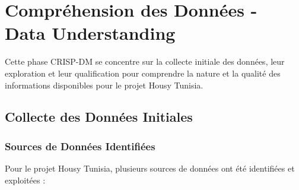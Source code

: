 \chapter{Compréhension des Données - Data Understanding}

\begin{objectivebox}
Cette phase CRISP-DM se concentre sur la collecte initiale des données, leur exploration et leur qualification pour comprendre la nature et la qualité des informations disponibles pour le projet Housy Tunisia.
\end{objectivebox}

\section{Collecte des Données Initiales}

\subsection{Sources de Données Identifiées}

Pour le projet Housy Tunisia, plusieurs sources de données ont été identifiées et exploitées :

